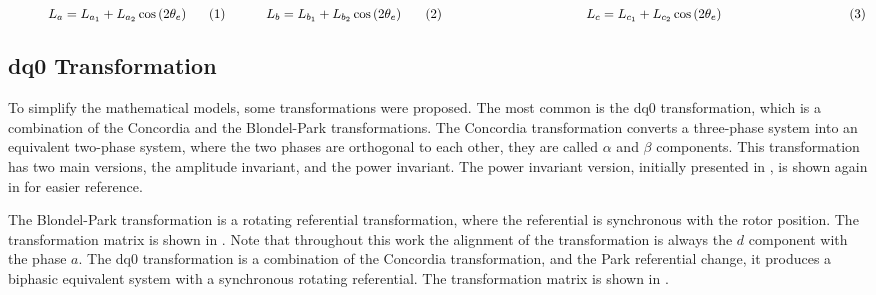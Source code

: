 \begin{subequations}
\begin{minipage}{.485\linewidth}
		\begin{equation}
			L_{a} = L_{a_1} + L_{a_2} \cos{ \left(2 \theta_e\right)}
		\end{equation}
	\end{minipage}
	\begin{minipage}{.485\linewidth}
		\begin{equation}
			L_{b} = L_{b_1} + L_{b_2} \cos{ \left(2 \theta_e\right)}
		\end{equation}
	\end{minipage}
	\\
	\begin{minipage}{.95\linewidth}
		\begin{equation}
			L_{c} = L_{c_1} + L_{c_2} \cos{ \left(2 \theta_e\right)}
		\end{equation}
	\end{minipage}
	\label{eq:induc_figure}
\end{subequations}
\subsection{dq0 Transformation}
\vfill
To simplify the mathematical models, some transformations were proposed. The most common is the dq0 transformation, which is a combination of the Concordia and the Blondel-Park transformations. The Concordia transformation converts a three-phase system into an equivalent two-phase system, where the two phases are orthogonal to each other, they are called $\alpha$ and $\beta$ components. This transformation has two main versions, the amplitude invariant, and the power invariant. The power invariant version, initially presented in , is shown again in  for easier reference.

The Blondel-Park transformation is a rotating referential transformation, where the referential is synchronous with the rotor position. The transformation matrix is shown in . Note that throughout this work the alignment of the transformation is always the $d$ component with the phase $a$. The dq0 transformation is a combination of the Concordia transformation, and the Park referential change, it produces a biphasic equivalent system with a synchronous rotating referential. The transformation matrix is shown in .

